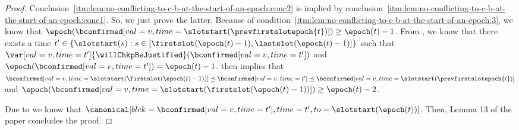 \documentclass{article}
\begin{document}
\begin{proof}
    Conclusion~\ref{itm:lem:no-conflicting-to-c-b-at-the-start-of-an-epoch:conc2} is implied by conclusion~\ref{itm:lem:no-conflicting-to-c-b-at-the-start-of-an-epoch:conc1}.
    So, we just prove the latter.
    Because of condition~\ref{itm:lem:no-conflicting-to-c-b-at-the-start-of-an-epoch:3},
    we know that $\epoch(\bconfirmed[val=v,time=\slotstart(\prevfirstslotepoch{t})])\geq\epoch(t)-1$. 
    From , we know that there exists a time $t' \in \{\slotstart(s): s \in [\firstslot(\epoch(t)-1),\lastslot(\epoch(t)-1)]\}$ such that $\var[val=v,time=t']{\willChkpBeJustified}(\bconfirmed[val=v,time=t'])$ and $\epoch(\bconfirmed[val=v,time=t'] ) = \epoch(t)-1$.
     then implies that $\bconfirmed[val=v,time=\slotstart(\firstslot(\epoch(t)-1))] \preceq \bconfirmed[val=v,time=t'] \preceq \bconfirmed[val=v,time=\slotstart(\prevfirstslotepoch{t})]$ and $\epoch(\bconfirmed[val=v,time=\slotstart(\firstslot(\epoch(t)-1))] ) \geq \epoch(t)-2$.

    Due to  we know that $\canonical[blck={\bconfirmed[val=v,time=t']},time=t',to=\slotstart(\epoch(t))]$.
    Then, Lemma 13 of the paper concludes the proof.


    

\end{proof}
\end{document}
